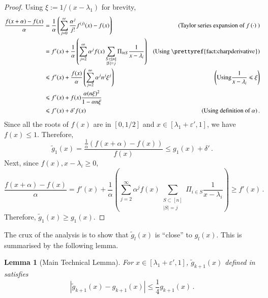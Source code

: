 \documentclass{article}[12pt]
\newtheorem{lemma}[theorem]{Lemma}
\theoremstyle{definition}
\renewcommand{\leq}{\leqslant}
\renewcommand{\geq}{\geqslant}
\newcommand{\mper}{\,.}
\newcommand{\paren}[1]{\left(#1 \right )}
\newcommand{\Abs}[1]{\left\lvert#1\right\rvert}
\newcommand{\defeq}{\stackrel{\textup{def}}{=}}
\newcommand{\e}{\epsilon}
\let\e\varepsilon
\renewcommand{\defeq}{:=}
\newcommand{\charp}{f}
\newcommand{\mom}{g}
\newcommand{\tg}{\tilde{g}}
\newcommand{\eprime}{\e'}
\begin{document}
\begin{proof}


Using $\xi \defeq 1/(x-\lambda_1)$ for brevity,
\begin{align*}
\frac{\charp(x+\alpha) - \charp(x) }{\alpha} & = \frac{1}{\alpha} \paren{\sum_{j = 0}^\infty 
		\frac{\alpha^j}{j!} \charp^{(j)}(x) - \charp(x)} 
	& \textrm{(Taylor series expansion of $ \charp \paren{\cdot}$ )} \\
 & = \charp'(x) + \frac{1}{\alpha} \paren{\sum_{j = 2}^\infty \alpha^j \charp(x) 
	\sum_{ \substack{ S \subset [n] \\ \Abs{S} = j}} \Pi_{i \in S} \frac{1}{x-\lambda_i} }  
		& \textrm{(Using \prettyref{fact:charpderivative})}\\
 & \leq \charp'(x) + \frac{\charp(x)}{\alpha} \paren{\sum_{j = 2}^\infty \alpha^j n^j \xi^j }
	& \paren{ \textrm{Using} \frac{1}{x - \lambda_i} \leq \xi}	\\
 & \leq \charp'(x) + \charp(x) \frac{\alpha (n \xi)^2 }{1 - \alpha n \xi} \\
 & \leq \charp'(x) + \delta' \charp(x) & \textrm{(Using definition of $\alpha$)}\mper
\end{align*}
Since all the roots of $\charp(x)$ are in $[0,1/2]$ and $x \in [\lambda_1 + \eprime,1]$, 
we have$\charp(x) \leq 1$. Therefore,  
\[ \tg_1(x) = \frac{ \frac{1}{\alpha} \paren{ \charp(x + \alpha) - \charp(x)}}{\charp(x)} 
\leq \mom_1(x) + \delta' \mper \]
Next, since $f(x), x - \lambda_i \geq 0$,  
\[ \frac{\charp(x+\alpha) - \charp(x) }{\alpha} = \charp'(x) + \frac{1}{\alpha} \paren{\sum_{j = 2}^\infty \alpha^j \charp(x) 
	\sum_{ \substack{ S \subset [n] \\ \Abs{S} = j}} \Pi_{i \in S} \frac{1}{x-\lambda_i} }  
		\geq \charp'(x) \mper \]
Therefore,  $\tg_1(x) \geq \mom_1(x)$.

\end{proof}



The crux of the analysis is to show that $\tg_l(x)$ is ``close'' to $\mom_l(x)$.
This is summarised by the following lemma. 
\begin{lemma}[Main Technical Lemma]
\label{lem:approx-der}
For $x \in [\lambda_1 + \eprime,1]$, 
$\tg_{k+1}(x)$ defined in  satisfies
 \[ \Abs{ \tg_{k+1}(x) - \mom_{k+1}(x)} \leq \frac{1}{4} \mom_{k+1}(x) \mper \]
\end{lemma}
\end{document}
